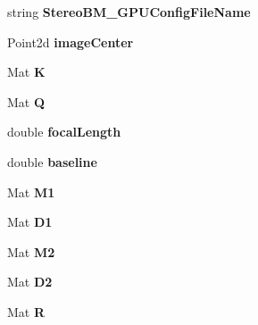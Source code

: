 \begin{DoxyCompactItemize}
\item 
string {\bfseries Stereo\+B\+M\+\_\+\+G\+P\+U\+Config\+File\+Name}\hypertarget{class_stereo_calib_a8a101f83f7c8658bdbc979cc7604da7c}{}\label{class_stereo_calib_a8a101f83f7c8658bdbc979cc7604da7c}

\item 
Point2d {\bfseries image\+Center}\hypertarget{class_stereo_calib_aeebd81b1fef9762b6171bb69a54b955e}{}\label{class_stereo_calib_aeebd81b1fef9762b6171bb69a54b955e}

\item 
Mat {\bfseries K}\hypertarget{class_stereo_calib_ad055d005c5506befd16edb185e21233d}{}\label{class_stereo_calib_ad055d005c5506befd16edb185e21233d}

\item 
Mat {\bfseries Q}\hypertarget{class_stereo_calib_ad8423000f1dde7e8f9d03770506eb01b}{}\label{class_stereo_calib_ad8423000f1dde7e8f9d03770506eb01b}

\item 
double {\bfseries focal\+Length}\hypertarget{class_stereo_calib_af47674c0bb306d01d03dc7a3d727dc08}{}\label{class_stereo_calib_af47674c0bb306d01d03dc7a3d727dc08}

\item 
double {\bfseries baseline}\hypertarget{class_stereo_calib_a0ae91099682d585e07dcb61e0fa629b4}{}\label{class_stereo_calib_a0ae91099682d585e07dcb61e0fa629b4}

\item 
Mat {\bfseries M1}\hypertarget{class_stereo_calib_ab93c232d69d78bdc7b1b485fb36207d7}{}\label{class_stereo_calib_ab93c232d69d78bdc7b1b485fb36207d7}

\item 
Mat {\bfseries D1}\hypertarget{class_stereo_calib_acf3a38c2a866f0b183aebec6139ef935}{}\label{class_stereo_calib_acf3a38c2a866f0b183aebec6139ef935}

\item 
Mat {\bfseries M2}\hypertarget{class_stereo_calib_a98aaed9d770345d1fe5c2a1eace17197}{}\label{class_stereo_calib_a98aaed9d770345d1fe5c2a1eace17197}

\item 
Mat {\bfseries D2}\hypertarget{class_stereo_calib_aa8adb526019c31b55acf4d5ae7070a1d}{}\label{class_stereo_calib_aa8adb526019c31b55acf4d5ae7070a1d}

\item 
Mat {\bfseries R}\hypertarget{class_stereo_calib_a7adef19579d6c9038559cec648e3fcfe}{}\label{class_stereo_calib_a7adef19579d6c9038559cec648e3fcfe}


\end{DoxyCompactItemize}
